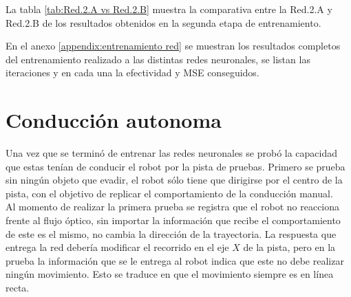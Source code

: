 \documentclass{iccmemoria}
\begin{document}
La tabla \ref{tab:Red.2.A vs Red.2.B} muestra la comparativa entre la Red.2.A y Red.2.B de los resultados obtenidos en la segunda etapa de entrenamiento.\\

\begin{table}[H]
\caption{Datos comparativos del entrenamiento en Red.2.A  y Red.2.B}
\label{tab:Red.2.A vs Red.2.B}
\end{table}

En el anexo \ref{appendix:entrenamiento red} se muestran los resultados completos del entrenamiento realizado a las distintas redes neuronales, se listan las iteraciones y en cada una la efectividad y MSE conseguidos.\\

\section{Conducción autonoma}

Una vez que se terminó de entrenar las redes neuronales se probó la capacidad que estas tenían de conducir el robot por la pista de pruebas. Primero se prueba sin ningún objeto que evadir, el robot sólo tiene que dirigirse por el centro de la pista, con el objetivo de replicar el comportamiento de la conducción manual.\\

Al momento de realizar la primera prueba se registra que el robot no reacciona frente al flujo óptico, sin importar la información que recibe el comportamiento de este es el mismo, no cambia la dirección de la trayectoria. La respuesta que entrega la red debería modificar el recorrido en el eje $X$ de la pista, pero en la prueba la información que se le entrega al robot indica que este no debe realizar ningún movimiento. Esto se traduce en que el movimiento siempre es en línea recta.\\
\end{document}
